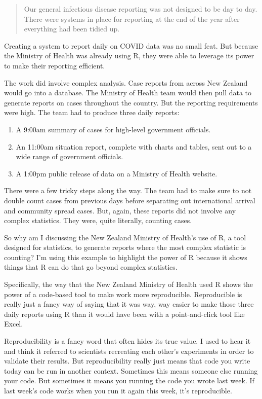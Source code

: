 \documentclass[
]{book}
\providecommand{\tightlist}{%
  \setlength{\itemsep}{0pt}\setlength{\parskip}{0pt}}
\begin{document}
\begin{quote}
Our general infectious disease reporting was not designed to be day to day. There were systems in place for reporting at the end of the year after everything had been tidied up.
\end{quote}

Creating a system to report daily on COVID data was no small feat. But because the Ministry of Health was already using R, they were able to leverage its power to make their reporting efficient.

The work did involve complex analysis. Case reports from across New Zealand would go into a database. The Ministry of Health team would then pull data to generate reports on cases throughout the country. But the reporting requirements were high. The team had to produce three daily reports:

\begin{enumerate}
\def\labelenumi{\arabic{enumi}.}
\tightlist
\item
  A 9:00am summary of cases for high-level government officials.
\item
  An 11:00am situation report, complete with charts and tables, sent out to a wide range of government officials.
\item
  A 1:00pm public release of data on a Ministry of Health website.
\end{enumerate}

There were a few tricky steps along the way. The team had to make sure to not double count cases from previous days before separating out international arrival and community spread cases. But, again, these reports did not involve any complex statistics. They were, quite literally, counting cases.

So why am I discussing the New Zealand Ministry of Health's use of R, a tool designed for statistics, to generate reports where the most complex statistic is counting? I'm using this example to highlight the power of R because it shows things that R can do that go beyond complex statistics.

Specifically, the way that the New Zealand Ministry of Health used R shows the power of a code-based tool to make work more reproducible. Reproducible is really just a fancy way of saying that it was way, way easier to make those three daily reports using R than it would have been with a point-and-click tool like Excel.

Reproducibility is a fancy word that often hides its true value. I used to hear it and think it referred to scientists recreating each other's experiments in order to validate their results. But reproducibility really just means that code you write today can be run in another context. Sometimes this means someone else running your code. But sometimes it means you running the code you wrote last week. If last week's code works when you run it again this week, it's reproducible.
\end{document}
